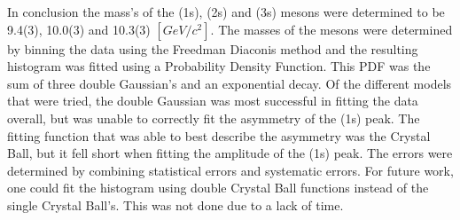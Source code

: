In conclusion the mass's of the \textUpsilon(1s), \textUpsilon(2s) and \textUpsilon(3s) mesons were determined to be 9.4(3), 10.0(3) and 10.3(3) $[GeV/c^2]$. The masses of the mesons were determined by binning the data using the Freedman Diaconis method and the resulting histogram was fitted using a Probability Density Function. This PDF was the sum of three double Gaussian's and an exponential decay. Of the different models that were tried, the double Gaussian was most successful in fitting the data overall, but was unable to correctly fit the asymmetry of the \textUpsilon(1s) peak. The fitting function that was able to best describe the asymmetry was the Crystal Ball, but it fell short when fitting the amplitude of the \textUpsilon(1s) peak. The errors were determined by combining statistical errors and systematic errors. For future work, one could fit the histogram using double Crystal Ball functions instead of the single Crystal Ball's. This was not done due to a lack of time.